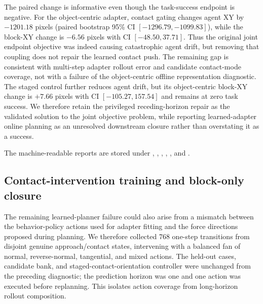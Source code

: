\documentclass{article}
\begin{document}
The paired change is informative even though the task-success endpoint is
negative.  For the object-centric adapter, contact gating changes agent XY by
$-1201.18$ pixels (paired bootstrap 95\% CI $[-1296.79,-1099.83]$), while
the block-XY change is $-6.56$ pixels with CI $[-48.50,37.71]$.  Thus the
original joint endpoint objective was indeed causing catastrophic agent
drift, but removing that coupling does not repair the learned contact push.
The remaining gap is consistent with multi-step adapter rollout error and
candidate contact-mode coverage, not with a failure of the object-centric
offline representation diagnostic.  The staged control further reduces agent
drift, but its object-centric block-XY change is $+7.66$ pixels with CI
$[-105.27,157.54]$ and remains at zero task success.  We therefore retain the
privileged receding-horizon repair as the validated solution to the joint
objective problem, while reporting learned-adapter online planning as an
unresolved downstream closure rather than overstating it as a success.

The machine-readable reports are stored under
,
,
,
,
,
and
.

\subsection{Contact-intervention training and block-only closure}
\label{sec:supp-contact-intervention-closure}

The remaining learned-planner failure could also arise from a mismatch between
the behavior-policy actions used for adapter fitting and the force directions
proposed during planning.  We therefore collected 768 one-step transitions
from disjoint genuine approach/contact states, intervening with a balanced fan
of normal, reverse-normal, tangential, and mixed actions.  The held-out cases,
candidate bank, and staged-contact-orientation controller were unchanged from
the preceding diagnostic; the prediction horizon was one and one action was
executed before replanning.  This isolates action coverage from long-horizon
rollout composition.
\end{document}
